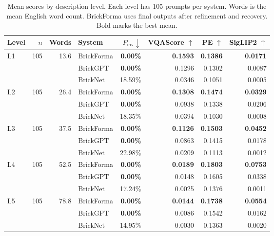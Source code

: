 \begin{table}[t]
\centering\small
\setlength{\tabcolsep}{3pt}
\begin{tabular}{lrrlrrrr}
\toprule
Level & $n$ & Words & System & $P_{\mathrm{inv}}\downarrow$ & VQAScore $\uparrow$ & PE $\uparrow$ & SigLIP2 $\uparrow$ \\
\midrule
L1 & 105 & 13.6 & BrickForma & \textbf{0.00\%} & \textbf{0.1593} & \textbf{0.1386} & \textbf{0.0171} \\
 &  &  & BrickGPT & \textbf{0.00\%} & 0.1296 & 0.1302 & 0.0087 \\
 &  &  & BrickNet & 18.59\% & 0.0346 & 0.1051 & 0.0005 \\
\midrule
L2 & 105 & 26.4 & BrickForma & \textbf{0.00\%} & \textbf{0.1308} & \textbf{0.1474} & \textbf{0.0329} \\
 &  &  & BrickGPT & \textbf{0.00\%} & 0.0938 & 0.1338 & 0.0206 \\
 &  &  & BrickNet & 18.35\% & 0.0394 & 0.1030 & 0.0008 \\
\midrule
L3 & 105 & 37.5 & BrickForma & \textbf{0.00\%} & \textbf{0.1126} & \textbf{0.1503} & \textbf{0.0452} \\
 &  &  & BrickGPT & \textbf{0.00\%} & 0.0863 & 0.1415 & 0.0178 \\
 &  &  & BrickNet & 22.98\% & 0.0209 & 0.1113 & 0.0012 \\
\midrule
L4 & 105 & 52.5 & BrickForma & \textbf{0.00\%} & \textbf{0.0189} & \textbf{0.1803} & \textbf{0.0753} \\
 &  &  & BrickGPT & \textbf{0.00\%} & 0.0148 & 0.1605 & 0.0338 \\
 &  &  & BrickNet & 17.24\% & 0.0025 & 0.1376 & 0.0011 \\
\midrule
L5 & 105 & 78.8 & BrickForma & \textbf{0.00\%} & \textbf{0.0144} & \textbf{0.1738} & \textbf{0.0554} \\
 &  &  & BrickGPT & \textbf{0.00\%} & 0.0086 & 0.1542 & 0.0162 \\
 &  &  & BrickNet & 14.95\% & 0.0030 & 0.1363 & 0.0020 \\
\bottomrule
\end{tabular}
\caption{Mean scores by description level. Each level has 105 prompts per system. Words is the mean English word count. BrickForma uses final outputs after refinement and recovery. Bold marks the best mean.}
\label{tab:level-results}
\end{table}
